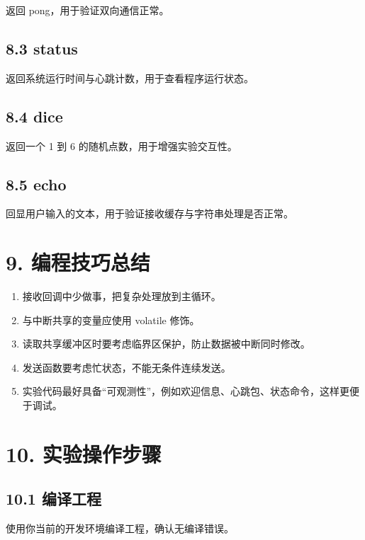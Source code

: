 \documentclass[
  chinese,
  UTF8,
  oneside,
  openany]{ctexbook}
\providecommand{\tightlist}{%
  \setlength{\itemsep}{0pt}\setlength{\parskip}{0pt}}
\begin{document}
返回 pong，用于验证双向通信正常。

\subsection{8.3 status}\label{status}

返回系统运行时间与心跳计数，用于查看程序运行状态。

\subsection{8.4 dice}\label{dice}

返回一个 1 到 6 的随机点数，用于增强实验交互性。

\subsection{\texorpdfstring{8.5 echo }{8.5 echo }}\label{echo}

回显用户输入的文本，用于验证接收缓存与字符串处理是否正常。

\section{9. 编程技巧总结}\label{ux7f16ux7a0bux6280ux5de7ux603bux7ed3}

\begin{enumerate}
\def\labelenumi{\arabic{enumi}.}
\tightlist
\item
  接收回调中少做事，把复杂处理放到主循环。
\item
  与中断共享的变量应使用 volatile 修饰。
\item
  读取共享缓冲区时要考虑临界区保护，防止数据被中断同时修改。
\item
  发送函数要考虑忙状态，不能无条件连续发送。
\item
  实验代码最好具备``可观测性''，例如欢迎信息、心跳包、状态命令，这样更便于调试。
\end{enumerate}

\section{10. 实验操作步骤}\label{ux5b9eux9a8cux64cdux4f5cux6b65ux9aa4}

\subsection{10.1 编译工程}\label{ux7f16ux8bd1ux5de5ux7a0b}

使用你当前的开发环境编译工程，确认无编译错误。
\end{document}
